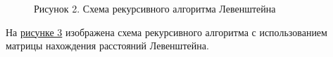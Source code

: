 \documentclass[12pt]{report}
\begin{document}
	\begin{figure}[h!]\label{picture_2}
		\caption*{Рисунок 2. Схема рекурсивного алгоритма Левенштейна}
	\end{figure}
	\newpage
	На \hyperref[picture_3]{рисунке 3} изображена схема рекурсивного алгоритма с использованием матрицы нахождения расстояний Левенштейна.
\end{document}
